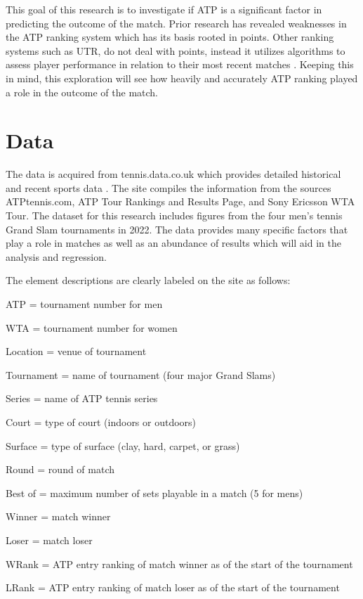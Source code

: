 \documentclass[12pt]{article}
\begin{document}
This goal of this research is to investigate if ATP is a significant factor
in predicting the outcome of the match. Prior research has revealed weaknesses 
in the ATP ranking system which has its basis rooted in points. Other ranking 
systems such as UTR, do not deal with points, instead it utilizes algorithms to 
assess player performance in relation to their most recent matches \citet{Bodo2022Rankings}. 
Keeping this in mind, this exploration will see how heavily and accurately ATP 
ranking played a role in the outcome of the match. 



\section{Data}
\label{sec:data}

The data is acquired from tennis.data.co.uk which provides detailed historical 
and recent sports data \citep{TennisBetting}. The site compiles the information 
from the sources ATPtennis.com, ATP Tour Rankings and Results Page, and Sony 
Ericsson WTA Tour. The dataset for this research includes figures from the four 
men's tennis Grand Slam tournaments in 2022. The data provides many specific 
factors that play a role in matches as well as an abundance of results which will 
aid in the analysis and regression.

The element descriptions are clearly labeled on the site as follows: 

ATP = tournament number for men

WTA = tournament number for women

Location = venue of tournament

Tournament =  name of tournament (four major Grand Slams)

Series = name of ATP tennis series

Court = type of court (indoors or outdoors)

Surface = type of surface (clay, hard, carpet, or grass)

Round = round of match

Best of = maximum number of sets playable in a match (5 for mens) 

Winner = match winner 

Loser = match loser

WRank = ATP entry ranking of match winner as of the start of the tournament

LRank = ATP entry ranking of match loser as of the start of the tournament
\end{document}
